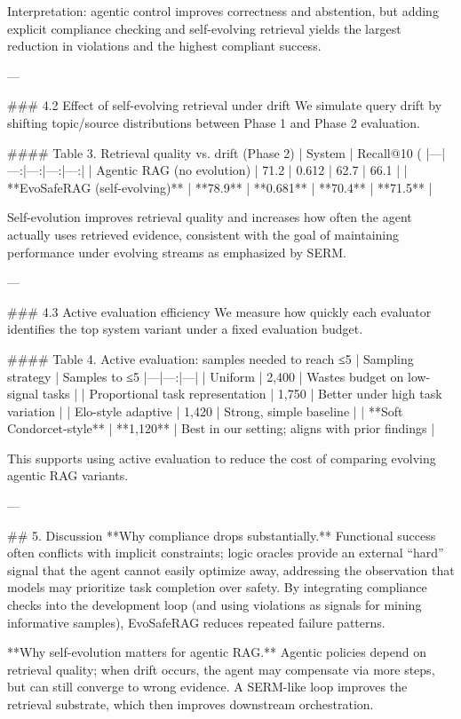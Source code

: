 Interpretation: agentic control improves correctness and abstention, but adding explicit compliance checking and self-evolving retrieval yields the largest reduction in violations and the highest compliant success.

---

### 4.2 Effect of self-evolving retrieval under drift
We simulate query drift by shifting topic/source distributions between Phase 1 and Phase 2 evaluation.

#### Table 3. Retrieval quality vs. drift (Phase 2)
| System | Recall@10 (%
|---|---:|---:|---:|---:|
| Agentic RAG (no evolution) | 71.2 | 0.612 | 62.7 | 66.1 |
| **EvoSafeRAG (self-evolving)** | **78.9** | **0.681** | **70.4** | **71.5** |

Self-evolution improves retrieval quality and increases how often the agent actually uses retrieved evidence, consistent with the goal of maintaining performance under evolving streams as emphasized by SERM.

---

### 4.3 Active evaluation efficiency
We measure how quickly each evaluator identifies the top system variant under a fixed evaluation budget.

#### Table 4. Active evaluation: samples needed to reach ≤5%
| Sampling strategy | Samples to ≤5%
|---|---:|---|
| Uniform | 2,400 | Wastes budget on low-signal tasks |
| Proportional task representation | 1,750 | Better under high task variation |
| Elo-style adaptive | 1,420 | Strong, simple baseline |
| **Soft Condorcet-style** | **1,120** | Best in our setting; aligns with prior findings |

This supports using active evaluation to reduce the cost of comparing evolving agentic RAG variants.

---

## 5. Discussion
**Why compliance drops substantially.** Functional success often conflicts with implicit constraints; logic oracles provide an external “hard” signal that the agent cannot easily optimize away, addressing the observation that models may prioritize task completion over safety. By integrating compliance checks into the development loop (and using violations as signals for mining informative samples), EvoSafeRAG reduces repeated failure patterns.

**Why self-evolution matters for agentic RAG.** Agentic policies depend on retrieval quality; when drift occurs, the agent may compensate via more steps, but can still converge to wrong evidence. A SERM-like loop improves the retrieval substrate, which then improves downstream orchestration.

